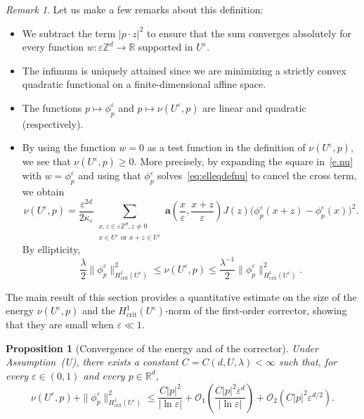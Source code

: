 \documentclass[11pt]{amsart}
\theoremstyle{plain}
\newtheorem{proposition}[theorem]{Proposition}
\theoremstyle{definition}
\theoremstyle{remark}
\newtheorem{remark}[theorem]{Remark}
\newcommand{\Zd}{\mathbb{Z}^d}
\newcommand{\Rd}{\mathbb{R}^d}
\newcommand{\R}{\mathbb{R}}
\renewcommand{\a}{\mathbf{a}}
\newcommand{\eps}{\varepsilon}
\begin{document}
	\begin{remark}
		Let us make a few remarks about this definition:
		\begin{itemize}
			\item We subtract the term $|p \cdot z|^2$ to ensure that the sum converges absolutely for every function $w \colon \eps\Zd \to \R$ supported in $U^\eps$.
			\item The infimum is uniquely attained since we are minimizing a strictly convex quadratic functional on a finite-dimensional affine space.
			\item The functions $p \mapsto \phi_p^\eps$ and $p \mapsto \nu(U^\eps, p)$ are linear and quadratic (respectively).
			\item By using the function $w = 0$ as a test function in the definition of $\nu(U^\eps, p)$, we see that $\nu(U^\eps, p) \geq 0$. More precisely, by expanding the square in~\eqref{e.nu} with $w = \phi_p^\eps$ and using that $\phi_p^\eps$ solves~\eqref{eq:elleqdefnu} to cancel the cross term, we obtain
			\[
			\nu(U^\eps, p)
			=
			\frac{\eps^{2d}}{2\kappa_\eps}
			\sum_{\substack{x, z \in \eps\Zd, z \ne 0 \\ x \in U^\eps \text{ or } x+z \in U^\eps}}
			\a\left(\frac{x}{\eps},\frac{x+z}{\eps}\right)
			J(z)\bigl(\phi_p^\eps(x{+}z) - \phi_p^\eps(x)\bigr)^2.
			\]
			By ellipticity,
			\begin{equation} \label{eq:comparisonnuandphi}
				\frac{\lambda}{2} \|\phi_p^\eps\|_{H^1_{\mathrm{crit}}(U^\eps)}^2
				\le \nu(U^\eps, p)
				\le \frac{\lambda^{-1}}{2} \|\phi_p^\eps\|_{H^1_{\mathrm{crit}}(U^\eps)}^2.
			\end{equation}
		\end{itemize}
	\end{remark}
	
	The main result of this section provides a quantitative estimate on the size of the energy $\nu(U^\eps, p)$ and the $H^1_{\mathrm{crit}}(U^\eps)$-norm of the first-order corrector, showing that they are small when $\eps \ll 1$.
	
	\begin{proposition}[Convergence of the energy and of the corrector]
		\label{p.dirichlet}
		Under Assumption~\textup{(U)}, there exists a constant $C = C(d, U, \lambda) < \infty$ such that, for every $\eps \in (0,1)$ and every $p \in \Rd$,
		\begin{equation}
			\label{e.dirichlet.as}
			\nu(U^\eps, p) + \|\phi_p^\eps\|_{H^1_{\mathrm{crit}}(U^\eps)}^2
			\le \frac{C|p|^2}{|\ln\eps|}
			+ \mathcal{O}_1\left(\frac{C|p|^2\eps^d}{|\ln\eps|}\right)
			+ \mathcal{O}_2\left(C|p|^2 \eps^{d/2}\right).
		\end{equation}
	\end{proposition}
	
\end{document}
